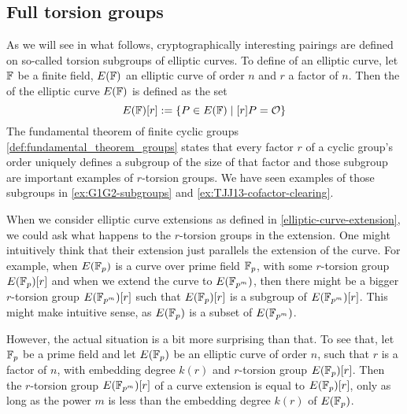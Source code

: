\subsection{Full torsion groups} As we will see in what follows, cryptographically interesting pairings are defined on so-called torsion subgroups of elliptic curves. To define  of an elliptic curve, let $\mathbb{F}$ be a finite field, $E(\mathbb{F})$ an elliptic curve of order $n$ and $r$ a factor of $n$. Then the  of the elliptic curve $E(\mathbb{F})$ is defined as the set
\begin{equation}
\label{def:torsion_group}
E(\mathbb{F})[r]:= \{P\in E(\mathbb{F})\;|\; [r]P = \mathcal{O}\}
\end{equation} 
The fundamental theorem of finite cyclic groups \ref{def:fundamental_theorem_groups} states that every factor $r$ of a cyclic group's order uniquely defines a subgroup of the size of that factor and those subgroup are important examples of $r$-torsion groups. We have seen examples of those subgroups in \ref{ex:G1G2-subgroups} and \ref{ex:TJJ13-cofactor-clearing}.

When we consider elliptic curve extensions as defined in \ref{elliptic-curve-extension}, we could ask what happens to the $r$-torsion groups in the extension. One might intuitively think that their extension just parallels the extension of the curve. For example, when $E(\mathbb{F}_p)$ is a curve over prime field $\mathbb{F}_p$, with some $r$-torsion group $E(\mathbb{F}_p)[r]$ and when we extend the curve to $E(\mathbb{F}_{p^m})$, then there might be a bigger $r$-torsion group $E(\mathbb{F}_{p^m})[r]$ such that $E(\mathbb{F}_p)[r]$ is a subgroup of $E(\mathbb{F}_{p^m})[r]$. This might make intuitive sense, as $E(\mathbb{F}_p)$ is a subset of $E(\mathbb{F}_{p^m})$. 

However, the actual situation is a bit more surprising than that. To see that, let $\mathbb{F}_p$ be a prime field and let $E(\mathbb{F}_p)$ be an elliptic curve of order $n$, such that $r$ is a factor of $n$, with embedding degree $k(r)$ and $r$-torsion group $E(\mathbb{F}_p)[r]$. Then the $r$-torsion group $E(\mathbb{F}_{p^m})[r]$ of a curve extension is equal to $E(\mathbb{F}_p)[r]$, only as long as the power $m$ is less than the embedding degree $k(r)$ of $E(\mathbb{F}_p)$. 

